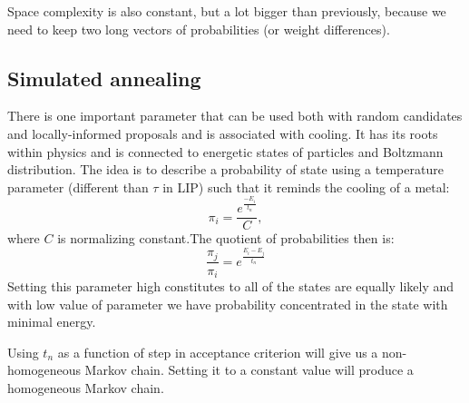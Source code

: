 		Space complexity is  also constant, but a lot bigger than previously, because we need to keep two  long vectors of probabilities (or weight differences).
	
\subsection{Simulated annealing}
	There is one important parameter that can be used both with random candidates and locally-informed proposals and is associated with cooling. It has its roots within physics and is connected to energetic states of particles and Boltzmann distribution. The idea is to describe a probability of state using a temperature parameter (different than $\tau$ in LIP) such that it reminds the cooling of a metal:
	\begin{equation*}
		\pi_i = \frac{e^{\frac{-E_i}{t_n}}}{C},
	\end{equation*}
	where $C$ is normalizing constant.The quotient of probabilities then is:
	\begin{equation*}
		\frac{\pi_j}{\pi_i} = e^{\frac{E_i - E_j}{t_n}}
	\end{equation*}
	Setting this parameter high constitutes to all of the states are equally likely and with low value of parameter we have probability concentrated in the state with minimal energy.
	
	Using $t_n$ as a function of step in acceptance criterion will give us a non-homogeneous Markov chain. Setting it to a constant value will produce a homogeneous Markov chain.